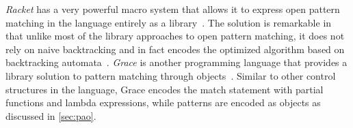 %
\emph{Racket} has a very powerful macro system that allows it to express open pattern 
matching in the language entirely as a library~\cite{Tobin-Hochstadt_2010}. 
The solution is remarkable in that unlike most of the library approaches to open pattern matching, 
it does not rely on naive backtracking and in fact encodes the optimized 
algorithm based on backtracking automata~\cite{Augustsson85,OPM01}. %
%
\emph{Grace} is another programming language that provides a library solution to 
pattern matching through objects~\cite{Grace2012}. Similar to other control 
structures in the language, Grace encodes the match statement with partial 
functions and lambda expressions, while patterns are encoded as objects as 
discussed in \textsection\ref{sec:pao}. %


